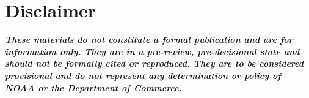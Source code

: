 \documentclass[11pt,
  english,
  a4paper,
]{article}
\begin{document}
\pagestyle{plain}  %
\renewcommand*{\thefootnote}{\arabic{footnote}}  %
\setcounter{footnote}{0}  %
\renewcommand{\headrulewidth}{0.5pt}
\renewcommand{\footrulewidth}{0.5pt}

\newcommand{\lt}{\ensuremath <}
\newcommand{\gt}{\ensuremath >}

\newlength{\cslhangindent}
\setlength{\cslhangindent}{1.5em}
\newenvironment{cslreferences}%
  {\setlength{\parindent}{0pt}%
  \everypar{\setlength{\hangindent}{\cslhangindent}}\ignorespaces}%
  {\par}

\setcounter{page}{1}

\renewcommand{\thetable}{\roman{table}}
\renewcommand{\thefigure}{\roman{figure}}

\setlength\parskip{0.5em plus 0.1em minus 0.2em}

\vspace{500cm}


\hypertarget{disclaimer}{%
\section*{Disclaimer}\label{disclaimer}}

\leavevmode\tagmcend\tagstructend


\emph{\textbf{These materials do not constitute a formal publication and are for information only. They are in a pre-review, pre-decisional state and should not be formally cited or reproduced. They are to be considered provisional and do not represent any determination or policy of NOAA or the Department of Commerce.}}

\leavevmode\tagmcend\tagstructend\par

\pagebreak

\pagebreak
\setlength{\parskip}{5mm plus1mm minus1mm}
\setcounter{page}{1}
\renewcommand{\thefigure}{\arabic{figure}}
\renewcommand{\thetable}{\arabic{table}}
\setcounter{table}{0}
\setcounter{figure}{0}
\end{document}
